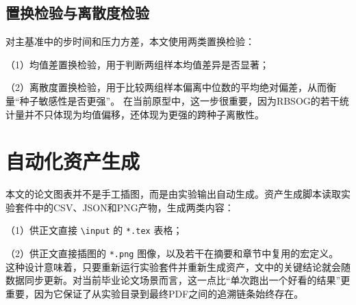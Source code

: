 \subsection{置换检验与离散度检验}

对主基准中的步时间和压力方差，本文使用两类置换检验：

（1）均值差置换检验，用于判断两组样本均值差异是否显著；

（2）离散度置换检验，用于比较两组样本偏离中位数的平均绝对偏差，从而衡量“种子敏感性是否更强”。
在当前原型中，这一步很重要，因为RBSOG的若干统计量并不只体现为均值偏移，还体现为更强的跨种子离散性。

\section{自动化资产生成}

本文的论文图表并不是手工插图，而是由实验输出自动生成。资产生成脚本读取实验套件中的CSV、JSON和PNG产物，生成两类内容：

（1）供正文直接 \texttt{\textbackslash input} 的 \texttt{*.tex} 表格；

（2）供正文直接插图的 \texttt{*.png} 图像，以及若干在摘要和章节中复用的宏定义。
这种设计意味着，只要重新运行实验套件并重新生成资产，文中的关键结论就会随数据同步更新。对当前毕业论文场景而言，这一点比“单次跑出一个好看的结果”更重要，因为它保证了从实验目录到最终PDF之间的追溯链条始终存在。
